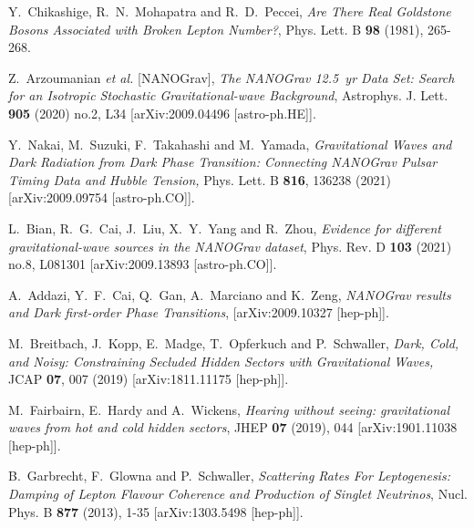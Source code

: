 \documentclass[a4paper,11pt]{article}
\begin{document}
\begin{thebibliography}{99}
Y.~Chikashige, R.~N.~Mohapatra and R.~D.~Peccei,
{\em Are There Real Goldstone Bosons Associated with Broken Lepton Number?},
Phys. Lett. B \textbf{98} (1981), 265-268.


Z.~Arzoumanian \textit{et al.} [NANOGrav],
{\em The NANOGrav 12.5~yr Data Set: Search for an Isotropic Stochastic Gravitational-wave Background},
Astrophys. J. Lett. \textbf{905} (2020) no.2, L34
[arXiv:2009.04496 [astro-ph.HE]].

Y.~Nakai, M.~Suzuki, F.~Takahashi and M.~Yamada,
{\em Gravitational Waves and Dark Radiation from Dark Phase Transition: Connecting NANOGrav Pulsar Timing Data and Hubble Tension,}
Phys. Lett. B \textbf{816}, 136238 (2021)
[arXiv:2009.09754 [astro-ph.CO]].

L.~Bian, R.~G.~Cai, J.~Liu, X.~Y.~Yang and R.~Zhou,
{\em Evidence for different gravitational-wave sources in the NANOGrav dataset},
Phys. Rev. D \textbf{103} (2021) no.8, L081301
[arXiv:2009.13893 [astro-ph.CO]].

A.~Addazi, Y.~F.~Cai, Q.~Gan, A.~Marciano and K.~Zeng,
{\em NANOGrav results and Dark first-order Phase Transitions},
[arXiv:2009.10327 [hep-ph]].

M.~Breitbach, J.~Kopp, E.~Madge, T.~Opferkuch and P.~Schwaller,
{\it Dark, Cold, and Noisy: Constraining Secluded Hidden Sectors with Gravitational Waves,}
JCAP \textbf{07}, 007 (2019)
[arXiv:1811.11175 [hep-ph]].

M.~Fairbairn, E.~Hardy and A.~Wickens,
{\em Hearing without seeing: gravitational waves from hot and cold hidden sectors},
JHEP \textbf{07} (2019), 044
[arXiv:1901.11038 [hep-ph]].


B.~Garbrecht, F.~Glowna and P.~Schwaller,
{\em Scattering Rates For Leptogenesis: Damping of Lepton Flavour Coherence and Production of Singlet Neutrinos},
Nucl. Phys. B \textbf{877} (2013), 1-35
[arXiv:1303.5498 [hep-ph]].


\end{thebibliography}
\end{document}
